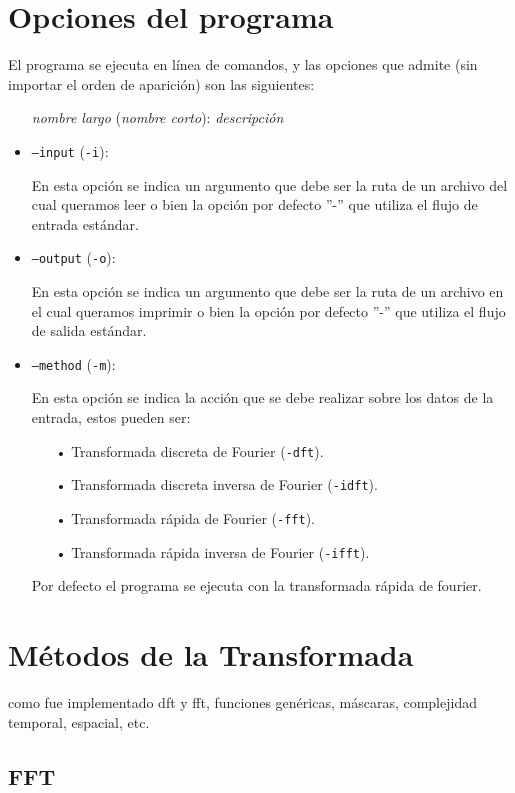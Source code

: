 \documentclass{article}
\begin{document}
\section{Opciones del programa}
  El programa se ejecuta en línea de comandos, y las opciones que admite (sin importar el orden de aparición) son las siguientes:
  \begin{itemize}
    \item[] \textit{nombre largo} (\textit{nombre corto}): \textit{descripción}
    \item \texttt{--input} (\texttt{-i}): 
    
    En esta opción se indica un argumento que debe ser la ruta de un archivo del cual queramos leer o bien la opción por defecto ”-” que utiliza el flujo de entrada estándar.
    \item \texttt{--output} (\texttt{-o}): 
    
    En esta opción se indica un argumento que debe ser la ruta de un archivo en el cual queramos imprimir o bien la opción por defecto ”-” que utiliza el flujo de salida estándar.
    \item \texttt{--method} (\texttt{-m}): 
    
    En esta opción se indica la acción que se debe realizar sobre los datos de la entrada, estos pueden ser:
    \begin{itemize}
    \item[•]Transformada discreta de Fourier (\texttt{-dft}).
    \item[•]Transformada discreta inversa de Fourier (\texttt{-idft}).
    \item[•]Transformada rápida de Fourier (\texttt{-fft}).
    \item[•]Transformada rápida inversa de Fourier (\texttt{-ifft}).
    
    \end{itemize}
    Por defecto el programa se ejecuta con la transformada rápida de fourier.
  \end{itemize}

\section{Métodos de la Transformada}
  como fue implementado dft y fft, funciones genéricas, máscaras, complejidad temporal, espacial, etc.
  \subsection{FFT}
\end{document}
